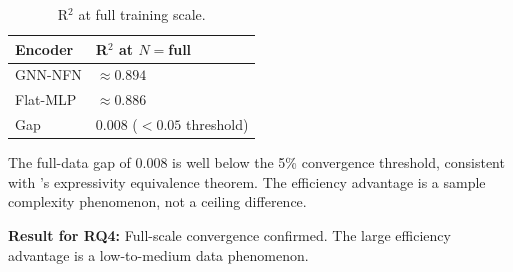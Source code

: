 \begin{table}[h]
\centering
\caption{R$^2$ at full training scale.}
\label{tab:fullscale}
\begin{tabular}{ll}
\toprule
Encoder & R$^2$ at $N{=}$full \\
\midrule
GNN-NFN  & ${\approx}0.894$ \\
Flat-MLP & ${\approx}0.886$ \\
Gap      & $0.008$ ($<0.05$ threshold) \\
\bottomrule
\end{tabular}
\end{table}

The full-data gap of 0.008 is well below the 5\% convergence threshold, consistent with \citet{Dayan2026Expressive}'s expressivity equivalence theorem. The efficiency advantage is a sample complexity phenomenon, not a ceiling difference.

\textbf{Result for RQ4:} Full-scale convergence confirmed. The large efficiency advantage is a low-to-medium data phenomenon.
